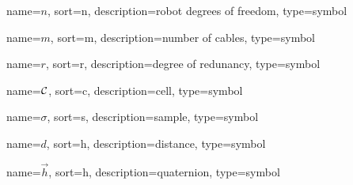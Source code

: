 	{%
		name=\ensuremath{n},
		sort=n,
		description=robot degrees of freedom,
		type=symbol
	}
	\newcommand{\robotdof}{\gls{sym:robotdof}}

	{%
		name=\ensuremath{m},
		sort=m,
		description=number of cables,
		type=symbol
	}
	\newcommand{\numcables}{\gls{sym:numcables}}

	{%
		name=\ensuremath{r},
		sort=r,
		description=degree of redunancy,
		type=symbol
	}
	\newcommand{\degofredundancy}{\gls{sym:degofredundancy}}

	{%
		name=\ensuremath{\set{C}},
		sort=c,
		description=cell,
		type=symbol
	}
	\newcommand{\cell}{\gls{sym:cell}}

	{%
		name=\ensuremath{\sigma},
		sort=s,
		description=sample,
		type=symbol
	}
	\newcommand{\sample}{\gls{sym:sample}}

	{%
		name=\ensuremath{d},
		sort=h,
		description=distance,
		type=symbol
	}
	\newcommand{\distance}{\gls{sym:distance}}

	{%
		name=\ensuremath{\vec{h}},
		sort=h,
		description=quaternion,
		type=symbol
	}
	\newcommand{\quaternion}{\gls{sym:quaternion}}

